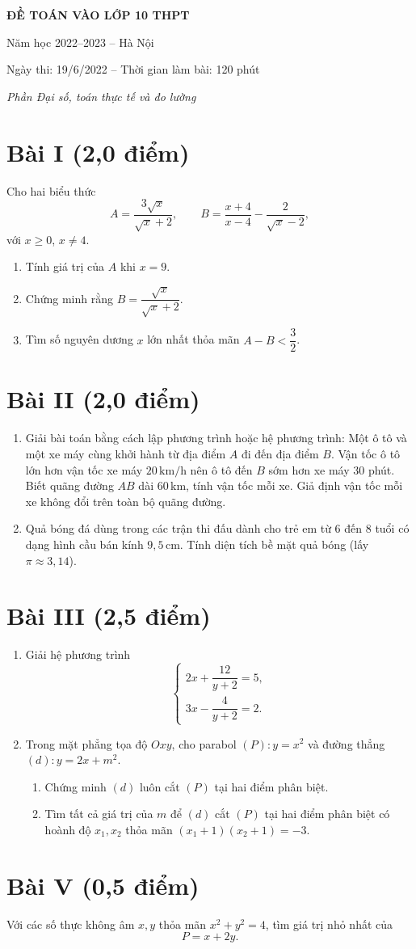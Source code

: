 \documentclass[12pt,a4paper]{article}
\begin{document}
\begin{center}
{\Large\bfseries ĐỀ TOÁN VÀO LỚP 10 THPT}\par
Năm học 2022--2023 -- Hà Nội\par
Ngày thi: 19/6/2022 -- Thời gian làm bài: 120 phút\par\smallskip
{\itshape Phần Đại số, toán thực tế và đo lường}
\end{center}

\section*{Bài I (2,0 điểm)}
Cho hai biểu thức
\[
A=\frac{3\sqrt{x}}{\sqrt{x}+2},\qquad
B=\frac{x+4}{x-4}-\frac{2}{\sqrt{x}-2},
\]
với $x\ge0$, $x\ne4$.
\begin{enumerate}
  \item Tính giá trị của $A$ khi $x=9$.
  \item Chứng minh rằng $B=\dfrac{\sqrt{x}}{\sqrt{x}+2}$.
  \item Tìm số nguyên dương $x$ lớn nhất thỏa mãn $A-B<\dfrac32$.
\end{enumerate}

\section*{Bài II (2,0 điểm)}
\begin{enumerate}
  \item Giải bài toán bằng cách lập phương trình hoặc hệ phương trình: Một ô tô và một xe máy cùng khởi hành từ địa điểm $A$ đi đến địa điểm $B$. Vận tốc ô tô lớn hơn vận tốc xe máy $20\,\mathrm{km/h}$ nên ô tô đến $B$ sớm hơn xe máy 30 phút. Biết quãng đường $AB$ dài $60\,\mathrm{km}$, tính vận tốc mỗi xe. Giả định vận tốc mỗi xe không đổi trên toàn bộ quãng đường.
  \item Quả bóng đá dùng trong các trận thi đấu dành cho trẻ em từ 6 đến 8 tuổi có dạng hình cầu bán kính $9{,}5\,\mathrm{cm}$. Tính diện tích bề mặt quả bóng (lấy $\pi\approx3{,}14$).
\end{enumerate}

\section*{Bài III (2,5 điểm)}
\begin{enumerate}
  \item Giải hệ phương trình
  \[
  \begin{cases}
  2x+\dfrac{12}{y+2}=5,\\[3pt]
  3x-\dfrac{4}{y+2}=2.
  \end{cases}
  \]
  \item Trong mặt phẳng tọa độ $Oxy$, cho parabol $(P):y=x^2$ và đường thẳng $(d):y=2x+m^2$.
  \begin{enumerate}[label=\alph*)]
    \item Chứng minh $(d)$ luôn cắt $(P)$ tại hai điểm phân biệt.
    \item Tìm tất cả giá trị của $m$ để $(d)$ cắt $(P)$ tại hai điểm phân biệt có hoành độ $x_1,x_2$ thỏa mãn $(x_1+1)(x_2+1)=-3$.
  \end{enumerate}
\end{enumerate}

\section*{Bài V (0,5 điểm)}
Với các số thực không âm $x,y$ thỏa mãn $x^2+y^2=4$, tìm giá trị nhỏ nhất của
\[
P=x+2y.
\]
\end{document}
